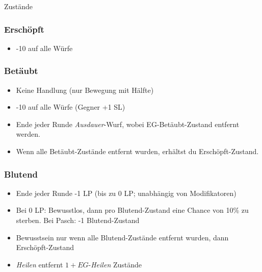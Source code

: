 \documentclass{article}
\begin{document}
\begin{multicols*}{3}
        


    \begin{slsframe}{Zustände}
        \subsubsection*{Erschöpft}
        \begin{itemize}%
            \item -10 auf alle Würfe
        \end{itemize}        

        \subsubsection*{Betäubt}
        \begin{itemize}%
            \item Keine Handlung (nur Bewegung mit Hälfte)
            \item -10 auf alle Würfe (Gegner +1 SL)
            \item Ende jeder Runde \textit{Ausdauer}-Wurf, wobei EG-Betäubt-Zustand entfernt werden.
            \item Wenn alle Betäubt-Zustände entfernt wurden, erhältst du Erschöpft-Zustand.
        \end{itemize}

    \subsubsection*{Blutend}
        \begin{itemize}%
            \item Ende jeder Runde -1 LP (bis zu 0 LP; unabhängig von Modifikatoren)
            \item Bei 0 LP: Bewusstlos, dann pro Blutend-Zustand eine Chance von 10\% zu sterben. Bei Pasch: -1 Blutend-Zustand
            \item Bewusstsein nur wenn alle Blutend-Zustände entfernt wurden, dann Erschöpft-Zustand
            \item \textit{Heilen} entfernt $1 + EG$-\textit{Heilen} Zustände
        \end{itemize}        


\end{slsframe}
\end{multicols*}
\end{document}

